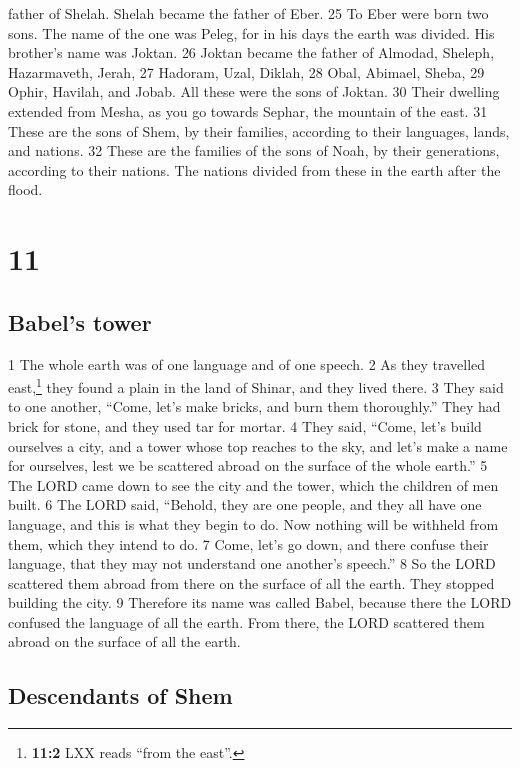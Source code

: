 father of Shelah. Shelah became the father of Eber. {25} To Eber were
born two sons. The name of the one was Peleg, for in his days the earth
was divided. His brother's name was Joktan. {26} Joktan became the
father of Almodad, Sheleph, Hazarmaveth, Jerah, {27} Hadoram, Uzal,
Diklah, {28} Obal, Abimael, Sheba, {29} Ophir, Havilah, and Jobab. All
these were the sons of Joktan. {30} Their dwelling extended from Mesha,
as you go towards Sephar, the mountain of the east. {31} These are the
sons of Shem, by their families, according to their languages, lands,
and nations. {32} These are the families of the sons of Noah, by their
generations, according to their nations. The nations divided from these
in the earth after the flood.

\hypertarget{section-10}{%
\section{11}\label{section-10}}

\hypertarget{babels-tower}{%
\subsection{Babel's tower}\label{babels-tower}}

{1} The whole earth was of one language and of one speech. {2} As they
travelled east,\footnote{\textbf{11:2} LXX reads ``from the east''.}
they found a plain in the land of Shinar, and they lived there. {3} They
said to one another, ``Come, let's make bricks, and burn them
thoroughly.'' They had brick for stone, and they used tar for mortar.
{4} They said, ``Come, let's build ourselves a city, and a tower whose
top reaches to the sky, and let's make a name for ourselves, lest we be
scattered abroad on the surface of the whole earth.'' {5} The LORD came
down to see the city and the tower, which the children of men built. {6}
The LORD said, ``Behold, they are one people, and they all have one
language, and this is what they begin to do. Now nothing will be
withheld from them, which they intend to do. {7} Come, let's go down,
and there confuse their language, that they may not understand one
another's speech.'' {8} So the LORD scattered them abroad from there on
the surface of all the earth. They stopped building the city. {9}
Therefore its name was called Babel, because there the LORD confused the
language of all the earth. From there, the LORD scattered them abroad on
the surface of all the earth.

\hypertarget{descendants-of-shem}{%
\subsection{Descendants of Shem}\label{descendants-of-shem}}

